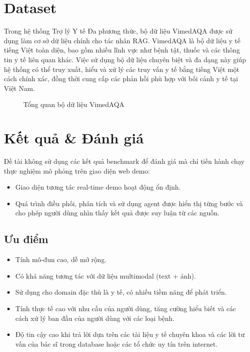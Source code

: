 \section{Dataset}

Trong hệ thống Trợ lý Y tế Đa phương thức, bộ dữ liệu VimedAQA được sử dụng làm cơ sở dữ liệu chính cho tác nhân RAG. VimedAQA là bộ dữ liệu y tế tiếng Việt toàn diện, bao gồm nhiều lĩnh vực như bệnh tật, thuốc và các thông tin y tế liên quan khác. Việc sử dụng bộ dữ liệu chuyên biệt và đa dạng này giúp hệ thống có thể truy xuất, hiểu và xử lý các truy vấn y tế bằng tiếng Việt một cách chính xác, đồng thời cung cấp các phản hồi phù hợp với bối cảnh y tế tại Việt Nam.

\begin{figure}[H]
    \centering
    \caption{Tổng quan bộ dữ liệu VimedAQA}
    \label{fig:dataset-overview}
\end{figure}

\section{Kết quả \& Đánh giá}

Đề tài không sử dụng các kết quả benchmark để đánh giá mà chỉ tiến hành chạy thực nghiệm mô phỏng trên giao diện web demo:

\begin{itemize}
    \item Giao diện tương tác real-time demo hoạt động ổn định.
    \item Quá trình điều phối, phân tích và sử dụng agent được hiển thị từng bước và cho phép người dùng nhìn thấy kết quả được suy luận từ các nguồn.
\end{itemize}

\subsection{Ưu điểm}

\begin{itemize}
    \item Tính mô-đun cao, dễ mở rộng.
    \item Có khả năng tương tác với dữ liệu multimodal (text + ảnh).
    \item Sử dụng cho domain đặc thù là y tế, có nhiều tiềm năng để phát triển.
    \item Tính thực tế cao với nhu cầu của người dùng, tăng cường hiểu biết và các cách xử lý ban đầu của người dùng với các loại bệnh.
    \item Độ tin cậy cao khi trả lời dựa trên các tài liệu y tế chuyên khoa và các lời tư vấn của bác sĩ trong database hoặc các tổ chức uy tín trên internet.
\end{itemize}

